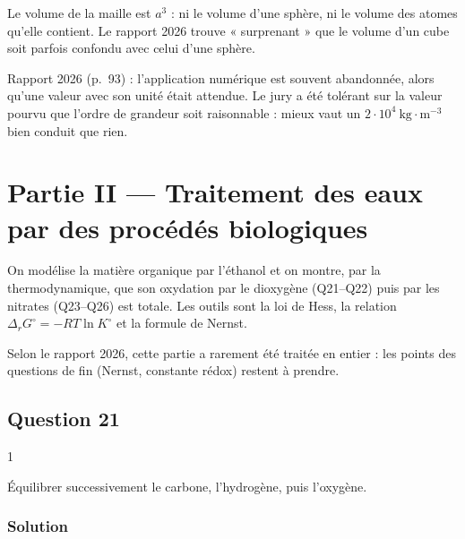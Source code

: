 \documentclass[11pt,a4paper]{article}
\begin{document}
\begin{piege}

Le volume de la maille est \(a^3\) : ni le volume d'une sphère, ni le volume des atomes qu'elle contient. Le rapport 2026 trouve « surprenant » que le volume d'un cube soit parfois confondu avec celui d'une sphère.

\end{piege}

\begin{jury}

Rapport 2026 (p.~93) : l'application numérique est souvent abandonnée, alors qu'une valeur avec son unité était attendue. Le jury a été tolérant sur la valeur pourvu que l'ordre de grandeur soit raisonnable : mieux vaut un \(2\cdot10^4\ \mathrm{kg\cdot m^{-3}}\) bien conduit que rien.

\end{jury}

\hypertarget{partie-ii-traitement-des-eaux-par-des-procuxe9duxe9s-biologiques}{%
\section{Partie II --- Traitement des eaux par des procédés biologiques}\label{partie-ii-traitement-des-eaux-par-des-procuxe9duxe9s-biologiques}}

On modélise la matière organique par l'éthanol et on montre, par la thermodynamique, que son oxydation par le dioxygène (Q21--Q22) puis par les nitrates (Q23--Q26) est totale. Les outils sont la loi de Hess, la relation \(\Delta_rG^\circ=-RT\ln K^\circ\) et la formule de Nernst.

Selon le rapport 2026, cette partie a rarement été traitée en entier : les points des questions de fin (Nernst, constante rédox) restent à prendre.

\hypertarget{question-21}{%
\subsection{Question 21}\label{question-21}}

\begin{indication}{1}

Équilibrer successivement le carbone, l'hydrogène, puis l'oxygène.

\end{indication}

\hypertarget{solution-20}{%
\subsubsection{Solution}\label{solution-20}}
\end{document}
